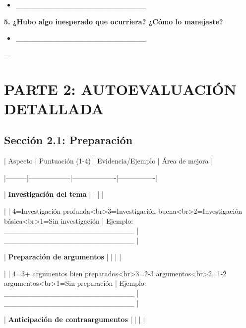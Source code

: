 \documentclass[a4paper,11pt]{article}
\begin{document}
\begin{itemize}

  \item _________________________

\end{itemize}

\vspace{0.2cm}

\textbf{5. ¿Hubo algo inesperado que ocurriera? ¿Cómo lo manejaste?}

\begin{itemize}

  \item _________________________

\end{itemize}

\vspace{0.2cm}

---

\vspace{0.2cm}

\section{PARTE 2: AUTOEVALUACIÓN DETALLADA}

\vspace{0.2cm}

\subsection{Sección 2.1: Preparación}

\vspace{0.2cm}

| Aspecto | Puntuación (1-4) | Evidencia/Ejemplo | Área de mejora |

|---------|------------------|-------------------|----------------|

| \textbf{Investigación del tema} | | | |

| | 4=Investigación profunda<br>3=Investigación buena<br>2=Investigación básica<br>1=Sin investigación | Ejemplo: _________________________ | _________________________ |

| \textbf{Preparación de argumentos} | | | |

| | 4=3+ argumentos bien preparados<br>3=2-3 argumentos<br>2=1-2 argumentos<br>1=Sin preparación | Ejemplo: _________________________ | _________________________ |

| \textbf{Anticipación de contraargumentos} | | | |
\end{document}
